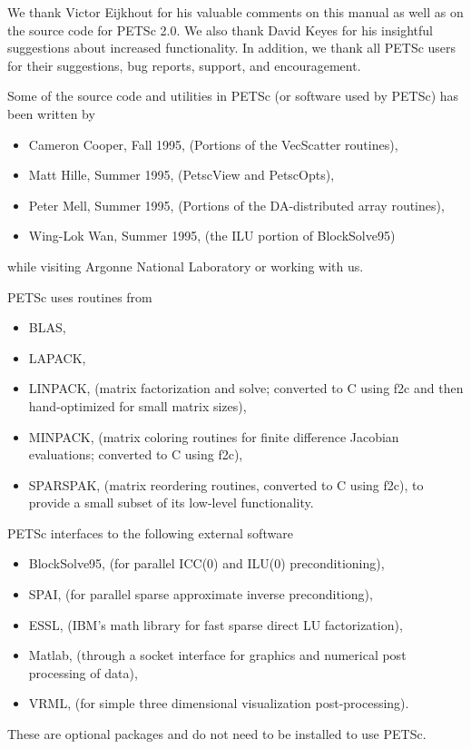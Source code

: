 

\medskip \medskip 
We thank Victor Eijkhout for his valuable comments on this
manual as well as on the source code for PETSc 2.0.  We also thank David
Keyes for his insightful suggestions about increased functionality.
In addition, we thank all PETSc users for
their suggestions, bug reports, support, and encouragement.

\vspace{.3in}
Some of the source code and utilities in PETSc (or software used by PETSc)
has been written by 
\begin{itemize}
  \item Cameron Cooper, Fall 1995, (Portions of the VecScatter routines), 
  \item Matt Hille, Summer 1995, (PetscView and PetscOpts), 
  \item Peter Mell, Summer 1995, (Portions of the DA-distributed array routines),
  \item Wing-Lok Wan, Summer 1995, (the ILU portion of BlockSolve95)
\end{itemize}
while visiting Argonne National Laboratory or working with us.

\vspace{.3in}
PETSc uses routines from 
\begin{itemize}
  \item BLAS, 
  \item LAPACK,
  \item LINPACK,      (matrix factorization and solve; converted to C using f2c and then 
                      hand-optimized for small matrix sizes),
  \item MINPACK,      (matrix coloring routines for finite difference Jacobian evaluations;
                      converted to C using f2c),
  \item SPARSPAK,     (matrix reordering routines, converted to C using f2c),
to provide a small subset of its low-level functionality.
\end{itemize}

\vspace{.3in}
PETSc interfaces to the following external software
\begin{itemize}
  \item BlockSolve95, (for parallel ICC(0) and ILU(0) preconditioning),
  \item SPAI,         (for parallel sparse approximate inverse preconditiong),
  \item ESSL,         (IBM's math library for fast sparse direct LU factorization),
  \item Matlab,       (through a socket interface for graphics and numerical post processing 
                       of data),
  \item VRML,         (for simple three dimensional visualization post-processing).
\end{itemize}
These are optional packages and do not need to be installed to use PETSc.


